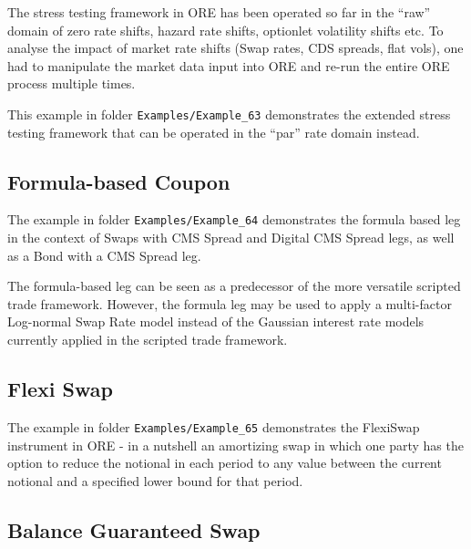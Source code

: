 The stress testing framework in ORE has been operated so far in the ``raw'' domain
of zero rate shifts, hazard rate shifts, optionlet volatility shifts etc.
To analyse the impact of market rate shifts (Swap rates, CDS spreads, flat vols), one had to
manipulate the market data input into ORE and re-run the entire ORE process multiple times.

This example in folder {\tt Examples/Example\_63} demonstrates the extended
stress testing framework that can be operated in the ``par'' rate domain instead.

\subsection{Formula-based Coupon}%
\label{example:64}

The example in folder {\tt Examples/Example\_64} demonstrates the
formula based leg in the context of Swaps with CMS Spread and
Digital CMS Spread legs, as well as a Bond with a CMS Spread leg.

The formula-based leg can be seen as a predecessor of the more versatile
scripted trade framework. However, the formula leg may be used to
apply a multi-factor Log-normal Swap Rate model instead of the Gaussian
interest rate models currently applied in the scripted trade framework.

\subsection{Flexi Swap}%
\label{example:65}

The example in folder {\tt Examples/Example\_65} demonstrates the
FlexiSwap instrument in ORE - in a nutshell an amortizing swap in which one party
has the option to reduce the notional in each period to any value between the current
notional and a specified lower bound for that period.

\subsection{Balance Guaranteed Swap}%
\label{example:66}

